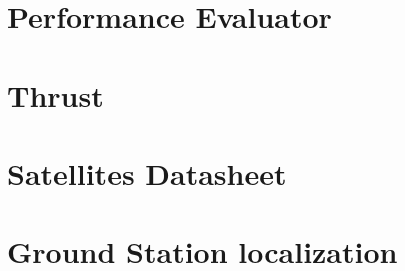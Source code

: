 \section{Performance Evaluator}
\label{PerformanceEvaluator}


\section{Thrust}
\label{Thrust}



\section{Satellites Datasheet}
\label{SatsDatashhet}


\section{Ground Station localization}
\label{GSlocalization}




